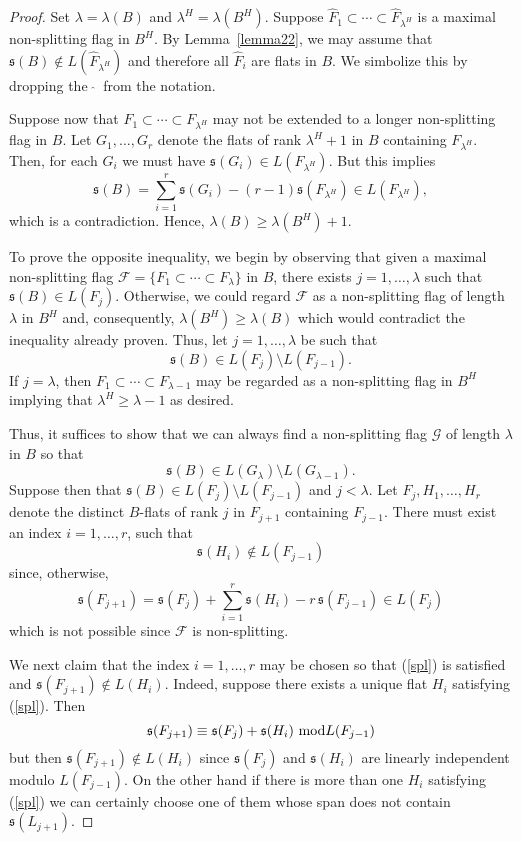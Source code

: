 \documentclass[11pt]{amsart}
\theoremstyle{plain}
\theoremstyle{definition}
\theoremstyle{remark}
\newcommand{\fs}{\mathfrak s}
\numberwithin{equation}{section}
\begin{document}
\begin{proof}
Set $\lambda=\lambda(B)$ and $\lambda^H = \lambda(B^H)$.
Suppose $\hat F_1 \subset \cdots \subset \hat F_{\lambda^H}$
is a maximal non-splitting flag in $B^H$.  By Lemma~\ref{lemma22}, we may assume that 
$\fs(B) \not \in  L(\hat F_{\lambda^H})$ and therefore all $\hat F_i$ are flats in $B$.  
We simbolize this by dropping the $\ \hat{}\ $ from the notation.

Suppose now that $F_1 \subset \cdots \subset F_{\lambda^H}$ 
may not be extended to a longer non-splitting flag in $B$.  
Let $G_1,\dots,G_r$ denote the flats of rank 
$\lambda^H + 1$ in $B$ containing $F_{\lambda^H}$.  
Then, for each $G_i$ we must have $\fs(G_i) \in  L(F_{\lambda^H})$.  
But this implies
$$\fs(B) = \sum_{i=1}^r \fs(G_i) - (r-1) \fs(F_{\lambda^H}) \in  L(F_{\lambda^H}),$$
which is a contradiction.  Hence, $\lambda(B) \geq \lambda(B^H) + 1$.

To prove the opposite inequality, we begin by observing that given a maximal non-splitting flag $\mathcal F =\{F_1 \subset \cdots \subset F_{\lambda}\}$  in $B$,  
there exists $j=1,\dots,\lambda$ such that $\fs(B) \in L(F_j)$.  Otherwise, we could regard $\mathcal F$ as a non-splitting flag 
of length $\lambda$ in $B^H$ and, consequently, $\lambda(B^H) \geq \lambda(B)$ which would contradict the inequality already proven.  
Thus, let $j = 1,\dots, \lambda$ be such that 
$$\fs(B) \in L(F_j) \setminus L(F_{j-1}).$$
If $j = \lambda$, then $F_1 \subset \cdots \subset F_{\lambda-1}$ may be regarded as a non-splitting flag in $B^H$ implying that $\lambda^H \geq \lambda - 1$ as desired.

Thus, it suffices to show that we can always find a non-splitting flag $\mathcal G$ of length $\lambda$ in $B$ so that 
\begin{equation}\label{top}\fs(B) \in L(G_\lambda) \setminus L(G_{\lambda-1}).
\end{equation}
  Suppose then that $\fs(B) \in L(F_j) \setminus L(F_{j-1})$ and $j < \lambda$.  Let $F_j,H_1,\dots,H_r$ denote the distinct $B$-flats of rank $j$ in $F_{j+1}$
   containing $F_{j-1}$.  There must exist an index $i=1,\dots,r$, such that 
\begin{equation}\label{spl}
\fs(H_i) \not \in L(F_{j-1})
\end{equation}
since, otherwise,
$$\fs(F_{j+1}) = \fs(F_j) + \sum_{i=1}^r \fs(H_i) - r\,\fs(F_{j-1}) \in L(F_j)$$
which is not possible since $\mathcal F$ is non-splitting. 

We next claim that the index  $i=1,\dots,r$ may be chosen so that  (\ref{spl}) is satisfied  and  $\fs(F_{j+1}) \not \in L(H_i)$.  
Indeed, suppose there exists a unique flat $H_i$ satisfying (\ref{spl}).  Then
$$\fs(F_{j+1}) \equiv \fs(F_j) + \fs(H_i)\ \hbox{mod} 
L(F_{j-1})$$
but then $\fs(F_{j+1}) \not \in L(H_i)$ since $\fs(F_j)$ and $ \fs(H_i)$ are linearly independent modulo $L(F_{j-1})$.  On the other hand if there is more than 
one $H_i$ satisfying (\ref{spl}) we can certainly choose one of them whose span does not contain $\fs(L_{j+1})$.  


\end{proof}
\end{document}
